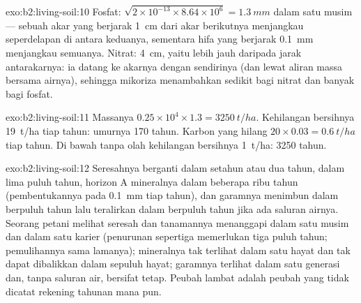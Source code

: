 \begin{solution}{exo:b2:living-soil:10}
Fosfat: $\sqrt{2\times 10^{-13}\times 8.64\times 10^{6}} =
\qty{1.3}{mm}$ dalam satu musim --- sebuah akar yang berjarak
\qty{1}{cm} dari akar berikutnya menjangkau seperdelapan  di
antara keduanya, sementara hifa yang berjarak \qty{0.1}{mm}
menjangkau semuanya. Nitrat: \qty{4}{cm}, yaitu lebih jauh daripada
jarak antarakarnya: ia datang ke akarnya dengan sendirinya (dan lewat
aliran massa bersama airnya), sehingga mikoriza menambahkan sedikit
bagi nitrat dan banyak bagi fosfat.
\end{solution}

\begin{solution}{exo:b2:living-soil:11}
Massanya $0.25\times 10^{4}\times 1.3 = \qty{3250}{t/ha}$. Kehilangan
bersihnya \qty{19}{t/ha} tiap tahun: umurnya 170 tahun. Karbon yang
hilang $20\times
0.03 = \qty{0.6}{t/ha}$ tiap tahun. Di bawah tanpa
olah  kehilangan bersihnya \qty{1}{t/ha}: 3250 tahun.
\end{solution}

\begin{solution}{exo:b2:living-soil:12}
Seresahnya berganti dalam setahun atau dua tahun,  dalam lima
puluh tahun, horizon A mineralnya dalam beberapa ribu tahun
(pembentukannya pada \qty{0.1}{mm} tiap tahun), dan garamnya menimbun
dalam berpuluh tahun lalu teralirkan dalam berpuluh tahun jika ada
saluran airnya. Seorang petani melihat seresah dan tanamannya
menanggapi dalam satu musim dan  dalam satu karier (penurunan
sepertiga memerlukan tiga puluh tahun; pemulihannya sama lamanya);
 mineralnya tak terlihat dalam satu hayat dan tak dapat
dibalikkan dalam sepuluh hayat; garamnya terlihat dalam satu generasi
dan, tanpa saluran air, bersifat tetap. Peubah lambat  adalah
peubah yang tidak dicatat rekening tahunan mana pun.
\end{solution}

